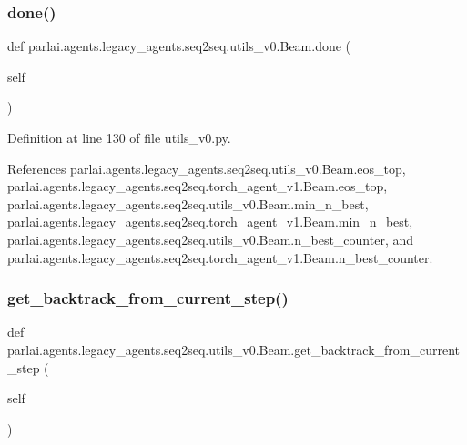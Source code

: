 \subsubsection{\texorpdfstring{done()}{done()}}
{\footnotesize\ttfamily def parlai.\+agents.\+legacy\+\_\+agents.\+seq2seq.\+utils\+\_\+v0.\+Beam.\+done (\begin{DoxyParamCaption}\item[{}]{self }\end{DoxyParamCaption})}



Definition at line 130 of file utils\+\_\+v0.\+py.



References parlai.\+agents.\+legacy\+\_\+agents.\+seq2seq.\+utils\+\_\+v0.\+Beam.\+eos\+\_\+top, parlai.\+agents.\+legacy\+\_\+agents.\+seq2seq.\+torch\+\_\+agent\+\_\+v1.\+Beam.\+eos\+\_\+top, parlai.\+agents.\+legacy\+\_\+agents.\+seq2seq.\+utils\+\_\+v0.\+Beam.\+min\+\_\+n\+\_\+best, parlai.\+agents.\+legacy\+\_\+agents.\+seq2seq.\+torch\+\_\+agent\+\_\+v1.\+Beam.\+min\+\_\+n\+\_\+best, parlai.\+agents.\+legacy\+\_\+agents.\+seq2seq.\+utils\+\_\+v0.\+Beam.\+n\+\_\+best\+\_\+counter, and parlai.\+agents.\+legacy\+\_\+agents.\+seq2seq.\+torch\+\_\+agent\+\_\+v1.\+Beam.\+n\+\_\+best\+\_\+counter.

\mbox{\label{classparlai_1_1agents_1_1legacy__agents_1_1seq2seq_1_1utils__v0_1_1Beam_a6deaa656e21fd41fafd2958a97ebea18}} 
\subsubsection{\texorpdfstring{get\+\_\+backtrack\+\_\+from\+\_\+current\+\_\+step()}{get\_backtrack\_from\_current\_step()}}
{\footnotesize\ttfamily def parlai.\+agents.\+legacy\+\_\+agents.\+seq2seq.\+utils\+\_\+v0.\+Beam.\+get\+\_\+backtrack\+\_\+from\+\_\+current\+\_\+step (\begin{DoxyParamCaption}\item[{}]{self }\end{DoxyParamCaption})}



